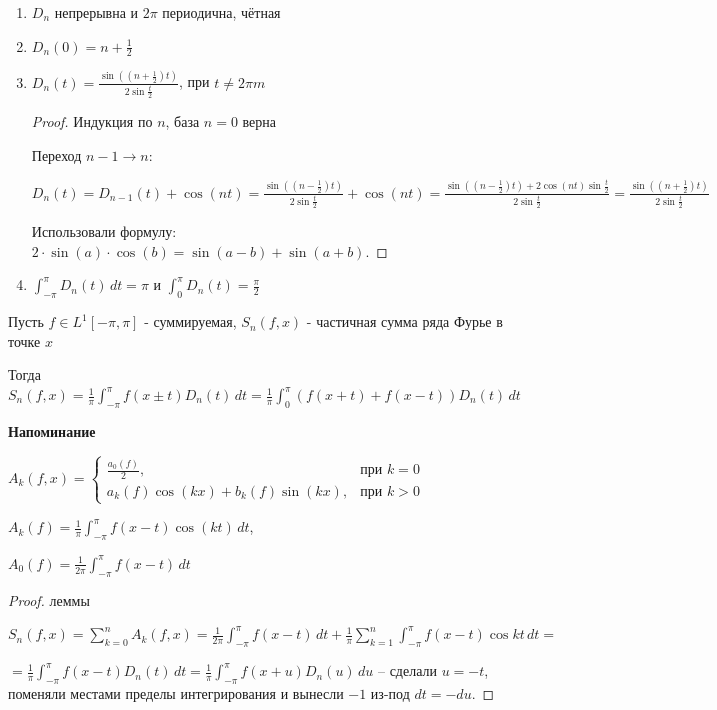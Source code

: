 \begin{properties}
    \begin{enumerate}
        \item $D_n$ непрерывна и $2\pi$ периодична, чётная
        \item $D_n (0) = n + \frac{1}{2}$
        \item {
            $D_n (t) = \frac{\sin ((n + \frac{1}{2})t)}{2\sin \frac{t}{2}}$, при $t \neq 2\pi m$

            \begin{proof}
                Индукция по $n$, база $n = 0$ верна

                Переход $n - 1 \to n$:

                $D_{n} (t) = D_{n - 1} (t) + \cos (nt) = \frac{\sin ((n - \frac{1}{2})t)}{2\sin \frac{t}{2}} + \cos (nt) = \frac{\sin ((n - \frac{1}{2})t) + 2\cos (nt) \sin \frac{t}{2}}{2\sin \frac{t}{2}} = \frac{\sin ((n + \frac{1}{2})t)}{2\sin \frac{t}{2}}$

                Использовали формулу: $2 \cdot \sin(a) \cdot \cos(b) = \sin(a - b) + \sin(a + b)$.
            \end{proof}
        }
        \item $\int_{-\pi}^\pi D_n (t) \, dt = \pi$ и $\int_0^\pi D_n (t) = \frac{\pi}{2}$
    \end{enumerate}
\end{properties}

\begin{lemma}
    Пусть $f \in L^1 [-\pi, \pi]$ - суммируемая, $S_n (f, x)$ - частичная сумма ряда Фурье в точке $x$

    Тогда $S_n (f, x) = \frac{1}{\pi} \int_{-\pi}^\pi f(x \pm t) D_n (t) \, dt = \frac{1}{\pi} \int_0^\pi (f(x + t) + f(x - t)) D_n (t) \, dt$
\end{lemma}

\textbf{Напоминание}

$A_k (f, x) =
\begin{cases}
    \frac{a_0 (f)}{2}, & \text{при $k = 0$} \\
    a_k (f) \cos (kx) + b_k (f) \sin (kx), & \text{при $k > 0$}
\end{cases}$

$A_k (f) = \frac{1}{\pi} \int_{-\pi}^\pi f(x - t) \cos (kt) \, dt$,

$A_0 (f) = \frac{1}{2\pi} \int_{-\pi}^\pi f(x - t) \, dt$

\begin{proof}
    леммы

    $S_n (f, x) = \sum_{k = 0}^n A_k (f, x) = \frac{1}{2\pi} \int_{-\pi}^\pi f(x - t) \, dt +  \frac{1}{\pi} \sum_{k = 1}^{n} \int_{-\pi}^\pi f(x - t) \cos kt \, dt = $

    $=\frac{1}{\pi} \int_{-\pi}^\pi f(x - t) D_n (t) \, dt = \frac{1}{\pi} \int_{-\pi}^\pi f(x + u) D_n (u) \, du$ -- сделали $u = -t$, поменяли местами пределы интегрирования и вынесли $-1$ из-под $dt = -du$.
\end{proof}

